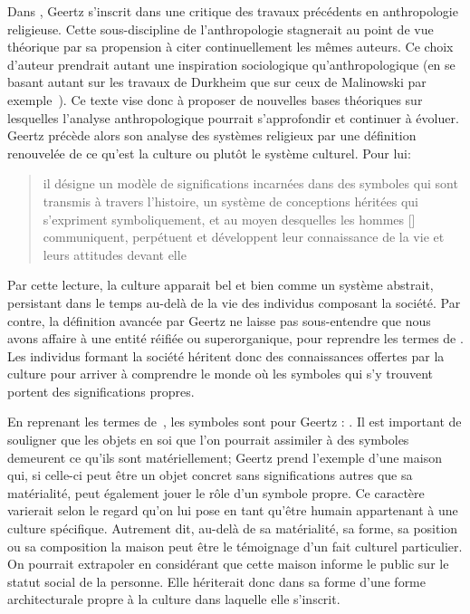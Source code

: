 Dans , Geertz s'inscrit dans une critique des travaux précédents en anthropologie religieuse. 
Cette sous-discipline de l'anthropologie stagnerait au point de vue théorique par sa propension à citer continuellement les mêmes auteurs. 
Ce choix d'auteur prendrait autant une inspiration sociologique qu'anthropologique (en se basant autant sur les travaux de Durkheim que sur ceux de Malinowski par exemple~\citep[20]{Geertz1972}). 
Ce texte vise donc à proposer de nouvelles bases théoriques sur lesquelles l'analyse anthropologique pourrait s'approfondir et continuer à évoluer. 
Geertz précède alors son analyse des systèmes religieux par une définition renouvelée de ce qu'est la culture ou plutôt le système culturel. 
Pour lui: \blockquote[{\cite[21]{Geertz1972}}][.]{\textelp{} il désigne un modèle de significations incarnées dans des symboles qui sont transmis à travers l'histoire, un système de conceptions héritées qui s'expriment symboliquement, et au moyen desquelles les hommes [] communiquent, perpétuent et développent leur connaissance de la vie et leurs attitudes devant elle}.

Par cette lecture, la culture apparait bel et bien comme un système abstrait, persistant dans le temps au-delà de la vie des individus composant la société. 
Par contre, la définition avancée par Geertz ne laisse pas sous-entendre que nous avons affaire à une entité réifiée ou superorganique, pour reprendre les termes de \citet{Duncan1980}. 
Les individus formant la société héritent donc des connaissances offertes par la culture pour arriver à comprendre le monde où les symboles qui s'y trouvent portent des significations propres.

En reprenant les termes de~\cite{Langer1962}, les symboles sont pour Geertz : . 
Il est important de souligner que les objets en soi que l'on pourrait assimiler à des symboles demeurent ce qu'ils sont matériellement; Geertz prend l'exemple d'une maison qui, si celle-ci peut être un objet concret sans significations autres que sa matérialité, peut également jouer le rôle d'un symbole propre. 
Ce caractère varierait selon le regard qu'on lui pose en tant qu'être humain appartenant à une culture spécifique. 
Autrement dit, au-delà de sa matérialité, sa forme, sa position ou sa composition la maison peut être le témoignage d'un fait culturel particulier. 
On pourrait extrapoler en considérant que cette maison informe le public sur le statut social de la personne. 
 Elle hériterait donc dans sa forme d'une forme architecturale propre à la culture dans laquelle elle s'inscrit.

